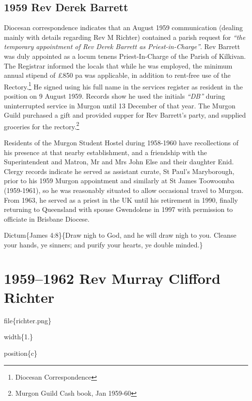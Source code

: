 \hypertarget{rev-derek-barrett}{%
\section{1959 Rev Derek Barrett}\label{rev-derek-barrett}}

Diocesan correspondence indicates that an August 1959 communication (dealing mainly with details regarding Rev M Richter) contained a parish request for \emph{``the temporary appointment of Rev Derek Barrett as Priest-in-Charge''}. Rev Barrett was duly appointed as a locum tenens Priest-In-Charge of the Parish of Kilkivan. The Registrar informed the locals that while he was employed, the minimum annual stipend of £850 pa was applicable, in addition to rent-free use of the Rectory.\footnote{Diocesan Correspondence} He signed using his full name in the services register as resident in the position on 9 August 1959. Records show he used the initials \emph{``DB''} during uninterrupted service in Murgon until 13 December of that year. The Murgon Guild purchased a gift and provided supper for Rev Barrett's party, and supplied groceries for the rectory.\footnote{Murgon Guild Cash book, Jan 1959-60}

Residents of the Murgon Student Hostel during 1958-1960 have recollections of his presence at that nearby establishment, and a friendship with the Superintendent and Matron, Mr and Mrs John Else and their daughter Enid. Clergy records indicate he served as assistant curate, St Paul's Maryborough, prior to his 1959 Murgon appointment and similarly at St James Toowoomba (1959-1961), so he was reasonably situated to allow occasional travel to Murgon. From 1963, he served as a priest in the UK until his retirement in 1990, finally returning to Queensland with spouse Gwendolene in 1997 with permission to officiate in Brisbane Diocese.

Dictum\{James 4:8\}\{Draw nigh to God, and he will draw nigh to you. Cleanse your hands, ye sinners; and purify your hearts, ye double minded.\}

\hypertarget{rev-murray-clifford-richter}{%
\chapter{1959--1962 Rev Murray Clifford Richter}\label{rev-murray-clifford-richter}}

file\{richter.png\}

width\{1.\}

position\{c\}

